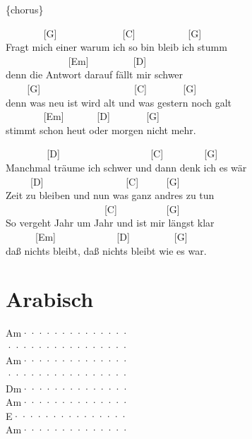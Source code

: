 \documentclass[
  letterpaper,
  twoside=false]{scrbook}
\begin{document}
\{chorus\}

~ ~ ~ ~ ~{[}G{]} ~ ~ ~ ~ ~ ~ ~ ~{[}C{]} ~ ~ ~ ~ ~ ~ {[}G{]}\\
Fragt mich einer warum ich so bin bleib ich stumm\\
\hspace*{0.333em} ~ ~ ~ ~ ~ ~ ~ ~{[}Em{]} ~ ~ ~ ~ ~ {[}D{]}\\
denn die Antwort darauf fällt mir schwer\\
\hspace*{0.333em} ~ ~ ~{[}G{]} ~ ~ ~ ~ ~ ~ ~ ~ ~ ~ ~ {[}C{]} ~ ~ ~ ~
{[}G{]}\\
denn was neu ist wird alt und was gestern noch galt\\
\hspace*{0.333em} ~ ~ ~ ~ ~{[}Em{]} ~ ~ ~ ~{[}D{]} ~ ~ ~ ~ {[}G{]}\\
stimmt schon heut oder morgen nicht mehr.

~ ~ ~ ~ ~ {[}D{]} ~ ~ ~ ~ ~ ~ ~ ~ ~ ~ ~{[}C{]} ~ ~ ~ ~ ~{[}G{]}\\
Manchmal träume ich schwer und dann denk ich es wär\\
\hspace*{0.333em} ~ ~ ~ {[}D{]} ~ ~ ~ ~ ~ ~ ~ ~ ~ ~{[}C{]} ~ ~ ~
{[}G{]}\\
Zeit zu bleiben und nun was ganz andres zu tun\\
\hspace*{0.333em} ~ ~ ~ ~ ~ ~ ~ ~ ~ ~ ~ ~ {[}C{]} ~ ~ ~ ~ ~ ~{[}G{]}\\
So vergeht Jahr um Jahr und ist mir längst klar\\
\hspace*{0.333em} ~ ~ ~ ~{[}Em{]} ~ ~ ~ ~ ~ ~ ~ {[}D{]} ~ ~ ~ ~ ~
{[}G{]}\\
daß nichts bleibt, daß nichts bleibt wie es war.

\hypertarget{arabisch}{%
\chapter{Arabisch}\label{arabisch}}

\textbar Am······\textbar········\textbar{}\\
\textbar········\textbar········\textbar{}\\
\textbar Am······\textbar········\textbar{}\\
\textbar········\textbar········\textbar{}\\
\textbar Dm······\textbar········\textbar{}\\
\textbar Am······\textbar········\textbar{}\\
\textbar E·······\textbar········\textbar{}\\
\textbar Am······\textbar········\textbar{}
\end{document}
